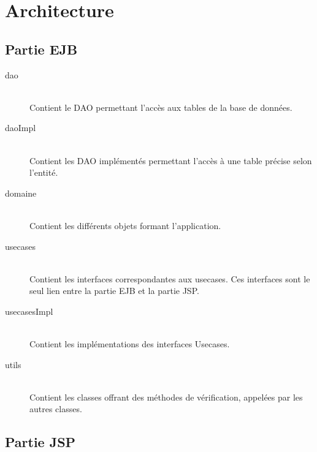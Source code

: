 \documentclass[11pt]{scrreprt}
\begin{document}
    \chapter{Architecture}
    \section{Partie EJB}
    \begin{description}
        \item[dao]\hfill \\ Contient le DAO permettant l'accès aux tables de la base de données.
        \item[daoImpl]\hfill \\ Contient les DAO implémentés permettant l'accès à une table précise selon l'entité.
        \item[domaine]\hfill \\ Contient les différents objets formant l'application.
        \item[usecases]\hfill \\ Contient les interfaces correspondantes aux usecases. Ces interfaces sont le seul lien entre la partie EJB et la partie JSP.
        \item[usecasesImpl]\hfill \\ Contient les implémentations des interfaces Usecases.
        \item[utils]\hfill \\ Contient les classes offrant des méthodes de vérification, appelées par les autres classes.
    \end{description}

    \section{Partie JSP}
\end{document}
